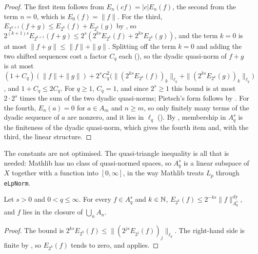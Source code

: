 \begin{proof}
\leanok
{}
The first item follows from $E_n(cf) = |c| E_n(f)$, the second from the term $n = 0$, which
is $E_0(f) = \|f\|$. For the third, $E_{2^{k+1}}(f + g) \leq E_{2^k}(f) + E_{2^k}(g)$ by
, so $2^{(k+1)s} E_{2^{k+1}}(f+g) \leq 2^s (2^{ks} E_{2^k}(f) +
2^{ks} E_{2^k}(g))$, and the term $k = 0$ is at most $\|f + g\| \leq \|f\| + \|g\|$.
Splitting off the term $k = 0$ and adding the two shifted sequences cost a factor $C_q$ each
(), so the dyadic quasi-norm of $f + g$ is at most
$(1 + C_q)(\|f\| + \|g\|) + 2^s C_q^2 \bigl(\|(2^{ks} E_{2^k}(f))_k\|_{\ell_q} +
\|(2^{ks} E_{2^k}(g))_k\|_{\ell_q}\bigr)$, and $1 + C_q \leq 2 C_q$. For $q \geq 1$, $C_q = 1$,
and since $2^s \geq 1$ this bound is at most $2 \cdot 2^s$ times the sum of the two dyadic
quasi-norms; Pietsch's form follows by . For the fourth,
$E_n(a) = 0$ for $a \in A_m$ and $n \geq m$, so only finitely many terms of the dyadic sequence
of $a$ are nonzero, and it lies in $\ell_q$ (). By
, membership in $A^s_q$ is the finiteness of the dyadic
quasi-norm, which gives the fourth item and, with the third, the linear structure.
\end{proof}

The constants are not optimised. The quasi-triangle inequality is all that is needed: Mathlib
has no class of quasi-normed spaces, so $A^s_q$ is a linear subspace of $X$ together with a
function into $[0, \infty]$, in the way Mathlib treats $L_p$ through \texttt{eLpNorm}.

\begin{lemma}
\label{lem:approx-closure}
\leanok
{}
Let $s > 0$ and $0 < q \leq \infty$. For every $f \in A^s_q$ and $k \in \mathbb{N}$,
$E_{2^k}(f) \leq 2^{-ks} \|f\|^{\mathrm{dy}}_{A^s_q}$, and $f$ lies in the closure of
$\bigcup_n A_n$.
\end{lemma}

\begin{proof}
\leanok
{}
The bound is $2^{ks} E_{2^k}(f) \leq \|(2^{js} E_{2^j}(f))_j\|_{\ell_q}$. The right-hand side is
finite by , so $E_{2^k}(f)$ tends to zero, and
 applies.
\end{proof}

